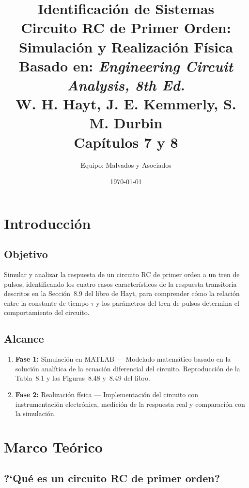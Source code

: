 \documentclass[12pt,a4paper]{article}
\title{
    \textbf{Identificaci\'on de Sistemas} \\[0.5cm]
    \Large Circuito RC de Primer Orden: Simulaci\'on y Realizaci\'on F\'isica \\[1cm]
    \large Basado en: \textit{Engineering Circuit Analysis, 8th Ed.} \\
    W. H. Hayt, J. E. Kemmerly, S. M. Durbin \\
    Cap\'itulos 7 y 8
}
\author{Equipo: Malvados y Asociados}
\date{\today}
\begin{document}
\maketitle
\tableofcontents
\newpage

\section{Introducci\'on}

\subsection{Objetivo}
Simular y analizar la respuesta de un circuito RC de primer orden a un tren de pulsos, identificando los cuatro casos caracter\'isticos de la respuesta transitoria descritos en la Secci\'on~8.9 del libro de Hayt, para comprender c\'omo la relaci\'on entre la constante de tiempo $\tau$ y los par\'ametros del tren de pulsos determina el comportamiento del circuito.

\subsection{Alcance}
\begin{enumerate}
    \item \textbf{Fase 1:} Simulaci\'on en MATLAB --- Modelado matem\'atico basado en la soluci\'on anal\'itica de la ecuaci\'on diferencial del circuito. Reproducci\'on de la Tabla~8.1 y las Figuras~8.48 y~8.49 del libro.
    \item \textbf{Fase 2:} Realizaci\'on f\'isica --- Implementaci\'on del circuito con instrumentaci\'on electr\'onica, medici\'on de la respuesta real y comparaci\'on con la simulaci\'on.
\end{enumerate}

\section{Marco Te\'orico}

\subsection{?`Qu\'e es un circuito RC de primer orden?}
\end{document}
